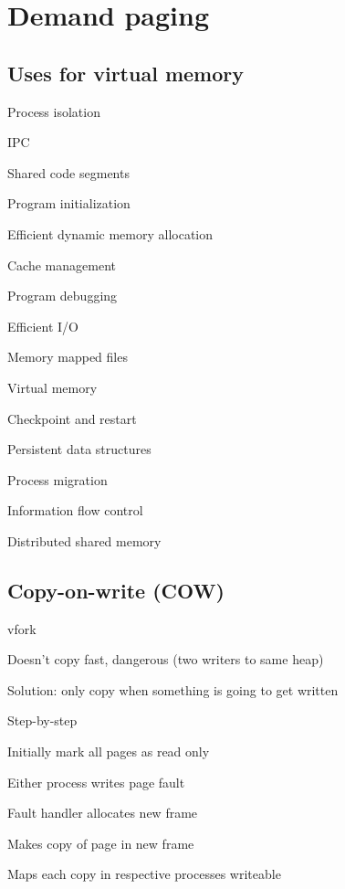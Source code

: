 \section{Demand paging}

\subsection{Uses for virtual memory}
\enumstart
	\item Process isolation
	\item IPC
	\item Shared code segments
	\item Program initialization
	\item Efficient dynamic memory allocation
	\item Cache management
	\item Program debugging
	\item Efficient I/O
	\item Memory mapped files
	\item Virtual memory
	\item Checkpoint and restart
	\item Persistent data structures
	\item Process migration
	\item Information flow control
	\item Distributed shared memory
	\item \ddd
\enumend

\subsection{Copy-on-write (COW)}
\enumstart
	\item vfork
	\item Doesn't copy \arrow fast, dangerous (two writers to same heap)
	\item Solution: only copy when something is going to get written
	\item Step-by-step
	\enumstart
		\item Initially mark all pages as read only
		\item Either process writes \arrow page fault
		\enumstart
			\item Fault handler allocates new frame
			\item Makes copy of page in new frame
			\item Maps each copy in respective processes writeable
		\enumend
	\enumend
\enumend


